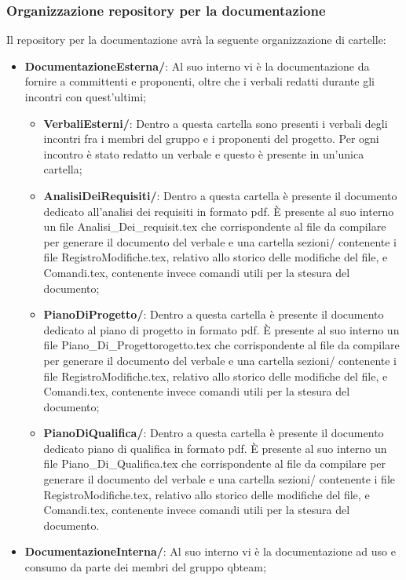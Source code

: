 \subsubsection{Organizzazione repository per la documentazione}
Il repository per la documentazione avrà la seguente organizzazione di cartelle:
\begin{itemize}
	\item \textbf{DocumentazioneEsterna/}: Al suo interno vi è la documentazione da fornire a committenti e proponenti, oltre che i verbali redatti durante gli incontri con quest'ultimi;
	\begin{itemize}
		\item \textbf{VerbaliEsterni/}: Dentro a questa cartella sono presenti i verbali degli incontri fra i membri del gruppo e i proponenti del progetto. Per ogni incontro è stato redatto un verbale e questo è presente in un'unica cartella;
		\item \textbf{AnalisiDeiRequisiti/}: Dentro a questa cartella è presente il documento dedicato all’analisi dei requisiti in formato pdf. È presente al suo interno un file Analisi\_Dei\_requisit.tex che corrispondente al file da compilare per generare il documento del verbale e una cartella sezioni/ contenente i file RegistroModifiche.tex, relativo allo storico delle modifiche del file, e Comandi.tex, contenente invece comandi utili per la stesura del documento;
		\item \textbf{PianoDiProgetto/}: Dentro a questa cartella è presente il documento dedicato al piano di progetto in formato pdf. È presente al suo interno un file Piano\_Di\_Progettorogetto.tex che corrispondente al file da compilare per generare il documento del verbale e una cartella sezioni/ contenente i file RegistroModifiche.tex, relativo allo storico delle modifiche del file, e Comandi.tex, contenente invece comandi utili per la stesura del documento;
		\item \textbf{PianoDiQualifica/}: Dentro a questa cartella è presente il documento dedicato piano di qualifica in formato pdf. È presente al suo interno un file Piano\_Di\_Qualifica.tex che corrispondente al file da compilare per generare il documento del verbale e una cartella sezioni/ contenente i file RegistroModifiche.tex, relativo allo storico delle modifiche del file, e Comandi.tex, contenente invece comandi utili per la stesura del documento.
	\end{itemize}
	\item \textbf{DocumentazioneInterna/}: Al suo interno vi è la documentazione ad uso e consumo da parte dei membri del gruppo qbteam;

\end{itemize}

